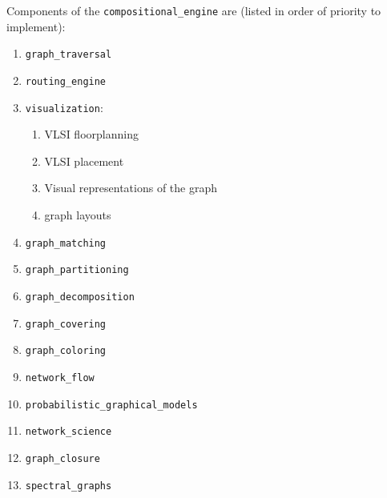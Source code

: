 Components of the {\tt compositional\_engine} are (listed in order of priority to implement): \vspace{-0.3cm}
\begin{enumerate} \itemsep -4pt
\item {\tt graph\_traversal}
\item {\tt routing\_engine}
\item {\tt visualization}: \vspace{-0.3cm}
	\begin{enumerate} \itemsep -2pt
	\item VLSI floorplanning
	\item VLSI placement
	\item Visual representations of the graph
	\item graph layouts
	\end{enumerate}
\item {\tt graph\_matching}
\item {\tt graph\_partitioning}
\item {\tt graph\_decomposition}
\item {\tt graph\_covering}
\item {\tt graph\_coloring}
\item {\tt network\_flow}
\item {\tt probabilistic\_graphical\_models}
\item {\tt network\_science}
\item {\tt graph\_closure}
\item {\tt spectral\_graphs}
\end{enumerate}








